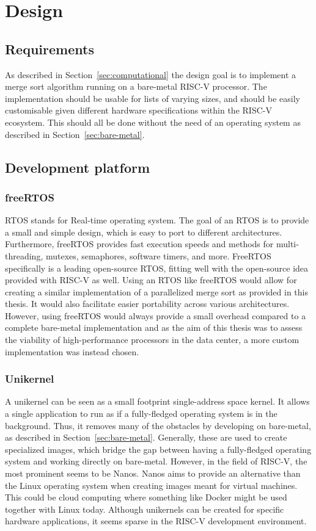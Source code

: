 \section{Design}\label{sec:Design}
\subsection{Requirements}
As described in Section~\ref{sec:computational} the design goal is to implement
a merge sort algorithm running on a bare-metal RISC-V processor. The
implementation should be usable for lists of varying sizes, and should be easily
customisable given different hardware specifications within the RISC-V
ecosystem. This should all be done without the need of an operating system as
described in Section~\ref{sec:bare-metal}.

\subsection{Development platform}
\subsubsection{freeRTOS}
RTOS stands for Real-time operating system. The goal of an RTOS is to provide a
small and simple design, which is easy to port to different architectures.
Furthermore, freeRTOS provides fast execution speeds and methods for
multi-threading, mutexes, semaphores, software timers, and more. FreeRTOS
specifically is a leading open-source RTOS, fitting well with the open-source
idea provided with RISC-V as well. Using an RTOS like freeRTOS would allow for
creating a similar implementation of a parallelized merge sort as provided in
this thesis. It would also facilitate easier portability across various
architectures. However, using freeRTOS would always provide a small overhead
compared to a complete bare-metal implementation and as the aim of this thesis
was to assess the viability of high-performance processors in the data center, a
more custom implementation was instead chosen.

\subsubsection{Unikernel}
A unikernel can be seen as a small footprint single-address space kernel. It
allows a single application to run as if a fully-fledged operating system is in
the background. Thus, it removes many of the obstacles by developing on
bare-metal, as described in Section~\ref{sec:bare-metal}. Generally, these are
used to create specialized images, which bridge the gap between having a
fully-fledged operating system and working directly on bare-metal. However, in
the field of RISC-V, the most prominent seems to be Nanos. Nanos aims to provide
an alternative than the Linux operating system when creating images meant for
virtual machines. This could be cloud computing where something like Docker
might be used together with Linux today. Although unikernels can be created for
specific hardware applications, it seems sparse in the RISC-V development
environment.

